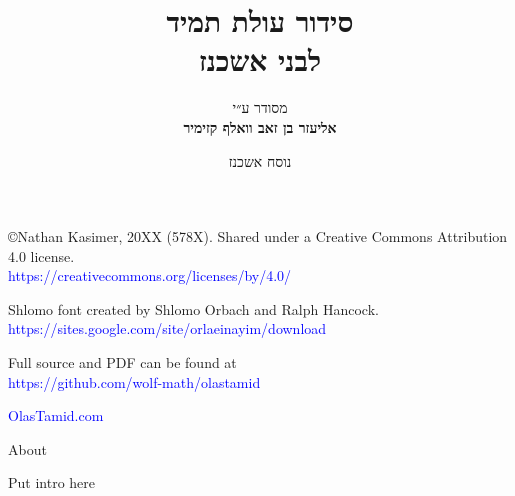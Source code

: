 \documentclass[twoside, openany, parskip=half, 11pt]{book}
\begin{document}
\title{  סידור עולת תמיד \\
לבני אשכנז\\
\vspace{.5in}
}

\author{מסודר ע״י
\\
\textbf{אליעזר בן זאב וואלף קזימיר}}
\date{נוסח אשכנז}

\maketitle

\begin{minipage}{\textwidth}
\begin{english}
\raggedright

©Nathan Kasimer, 20XX (578X). Shared under a Creative Commons Attribution 4.0 license.\\
\textcolor{blue}{https://creativecommons.org/licenses/by/4.0/}\\ \vspace{\baselineskip}


Shlomo font created by Shlomo Orbach and Ralph Hancock.\\ \textcolor{blue}{https://sites.google.com/site/orlaeinayim/download}\\ \vspace{\baselineskip}

Full \XeLaTeX \quad source and PDF can be found at\\ \textcolor{blue}{https://github.com/wolf-math/olastamid}\\ \vspace{\baselineskip}

\textcolor{blue}{OlasTamid.com}

\end{english}
\end{minipage}


\clearpage

\begin{minipage}{\textwidth}

\begin{english}
\begin{center} %
\begin{LARGE}
About
\end{LARGE}
\end{center}

Put intro here


\end{english}

\end{minipage}
\end{document}
